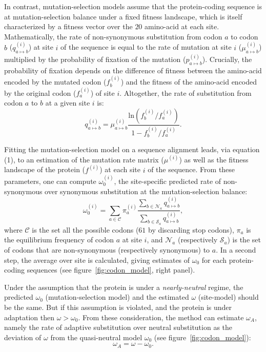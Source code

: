 \documentclass{article}
\begin{document}
In contrast, mutation-selection models assume that the protein-coding sequence is at mutation-selection balance under a fixed fitness landscape, which is itself characterized by a fitness vector over the $20$ amino-acid at each site\cite{yang_mutation-selection_2008, halpern_evolutionary_1998, rodrigue_mechanistic_2010}.
Mathematically, the rate of non-synonymous substitution from codon $a$ to codon $b$ ($q_{a \mapsto b}^{(i)}$) at site $i$ of the sequence is equal to the rate of mutation at site $i$ ($\mu_{a \mapsto b}^{(i)}$) multiplied by the probability of fixation of the mutation ($p_{a \mapsto b}^{(i)}$).
Crucially, the probability of fixation depends on the difference of fitness between the amino-acid encoded by the mutated codon ($f_b^{(i)}$) and the fitness of the amino-acid encoded by the original codon ($f_a^{(i)}$) of site $i$\cite{wright_evolution_1931, fisher_genetical_1930}.
Altogether, the rate of substitution from codon $a$ to $b$ at a given site $i$ is:
\begin{equation}
	q_{a \mapsto b}^{(i)} = \mu_{a \mapsto b}^{(i)} \dfrac{\mathrm{ln}(f_b^{(i)} / f_a^{(i)})}{1 - f_b^{(i)} / f_a^{(i)}}.
\end{equation}

Fitting the mutation-selection model on a sequence alignment leads, via equation (1), to an estimation of the mutation rate matrix ($\mu^{(i)}$) as well as the fitness landscape of the protein ($f^{(i)}$) at each site $i$ of the sequence.
From these parameters, one can compute $\omega_{0}^{(i)}$, the site-specific predicted rate of non-synonymous over synonymous substitution at the mutation-selection balance:
\begin{equation}
	\omega_{0}^{(i)} = \sum_{a \in \mathcal{C}} \pi_a^{(i)} \dfrac{\sum_{b \in \mathcal{N}_a} q_{a \mapsto b}^{(i)}}{\sum_{b \in \mathcal{S}_a} q_{a \mapsto b}^{(i)}},
\end{equation}
where $\mathcal{C}$ is the set all the possible codons ($61$ by discarding stop codons), $\pi_a$ is the equilibrium frequency of codon $a$ at site $i$, and $\mathcal{N}_a$ (respectively $\mathcal{S}_a$) is the set of codons that are non-synonymous (respectively synonymous) to $a$\cite{spielman_relationship_2015, rodrigue_detecting_2016}.
In a second step, the average over site is calculated, giving estimates of $\omega_0$ for each protein-coding sequences (see figure~\ref{fig:codon_model}, right panel).

Under the assumption that the protein is under a \textit{nearly-neutral} regime, the predicted $\omega_0$ (mutation-selection model) and the estimated $\omega$ (site-model) should be the same.
But if this assumption is violated, and the protein is under adaptation then $\omega > \omega_0$.
From these consideration, the method can estimate $\omega_A$, namely the rate of adaptive substitution over neutral substitution as the deviation of $\omega$ from the quasi-neutral model $\omega_0$ (see figure~\ref{fig:codon_model}):
\begin{equation}
	\omega_A = \omega - \omega_0.
\end{equation}
\end{document}
